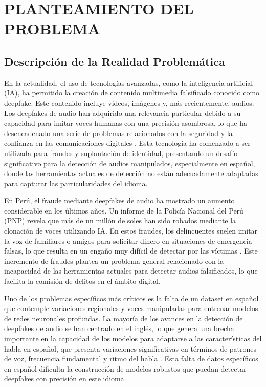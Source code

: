 \chapter{PLANTEAMIENTO DEL PROBLEMA}
\section{Descripción de la Realidad Problemática}

En la actualidad, el uso de tecnologías avanzadas, como la inteligencia artificial (IA), ha permitido la creación de contenido multimedia falsificado conocido como deepfake. Este contenido incluye videos, imágenes y, más recientemente, audios. Los deepfakes de audio han adquirido una relevancia particular debido a su capacidad para imitar voces humanas con una precisión asombrosa, lo que ha desencadenado una serie de problemas relacionados con la seguridad y la confianza en las comunicaciones digitales \parencite{heidari2023}. Esta tecnología ha comenzado a ser utilizada para fraudes y suplantación de identidad, presentando un desafío significativo para la detección de audios manipulados, especialmente en español, donde las herramientas actuales de detección no están adecuadamente adaptadas para capturar las particularidades del idioma.

En Perú, el fraude mediante deepfakes de audio ha mostrado un aumento considerable en los últimos años. Un informe de la Policía Nacional del Perú (PNP) revela que más de un millón de soles han sido robados mediante la clonación de voces utilizando IA. En estos fraudes, los delincuentes suelen imitar la voz de familiares o amigos para solicitar dinero en situaciones de emergencia falsas, lo que resulta en un engaño muy difícil de detectar por las víctimas \parencite{rojas2023}. Este incremento de fraudes plantea un problema general relacionado con la incapacidad de las herramientas actuales para detectar audios falsificados, lo que facilita la comisión de delitos en el ámbito digital.

Uno de los problemas específicos más críticos es la falta de un dataset en español que contemple variaciones regionales y voces manipuladas para entrenar modelos de redes neuronales profundas. La mayoría de los avances en la detección de deepfakes de audio se han centrado en el inglés, lo que genera una brecha importante en la capacidad de los modelos para adaptarse a las características del habla en español, que presenta variaciones significativas en términos de patrones de voz, frecuencia fundamental y ritmo del habla \parencite{heidari2023}. Esta falta de datos específicos en español dificulta la construcción de modelos robustos que puedan detectar deepfakes con precisión en este idioma.

